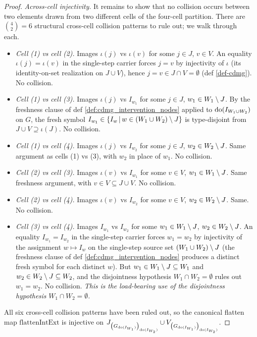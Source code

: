 \documentclass[main]{subfiles}
\providecommand{\flattenIntExt}{\mathrm{flattenIntExt}}
\begin{document}
\begin{proof}
\emph{Across-cell injectivity.}
It remains to show that no collision occurs between two elements drawn from two different cells of the four-cell partition. There are $\binom{4}{2} = 6$ structural cross-cell collision patterns to rule out; we walk through each.
\begin{itemize}
    \item \emph{Cell (1) vs cell (2).} Images $\iota(j)$ vs $\iota(v)$ for some $j \in J$, $v \in V$. An equality $\iota(j) = \iota(v)$ in the single-step carrier forces $j = v$ by injectivity of $\iota$ (its identity-on-set realization on $J \cup V$), hence $j = v \in J \cap V = \emptyset$ (def \ref{def-cdmg}). No collision.
    \item \emph{Cell (1) vs cell (3).} Images $\iota(j)$ vs $I_{w_1}$ for some $j \in J$, $w_1 \in W_1 \setminus J$. By the freshness clause of def \ref{def:cdmg_intervention_nodes} applied to $\operatorname{do}(I_{W_1 \cup W_2})$ on $G$, the fresh symbol $I_{w_1} \in \left \{ I_w \,\middle|\, w \in (W_1 \cup W_2) \setminus J \right \}$ is type-disjoint from $J \cup V \supseteq \iota(J)$. No collision.
    \item \emph{Cell (1) vs cell (4).} Images $\iota(j)$ vs $I_{w_2}$ for some $j \in J$, $w_2 \in W_2 \setminus J$. Same argument as cells (1) vs (3), with $w_2$ in place of $w_1$. No collision.
    \item \emph{Cell (2) vs cell (3).} Images $\iota(v)$ vs $I_{w_1}$ for some $v \in V$, $w_1 \in W_1 \setminus J$. Same freshness argument, with $v \in V \subseteq J \cup V$. No collision.
    \item \emph{Cell (2) vs cell (4).} Images $\iota(v)$ vs $I_{w_2}$ for some $v \in V$, $w_2 \in W_2 \setminus J$. Same. No collision.
    \item \emph{Cell (3) vs cell (4).} Images $I_{w_1}$ vs $I_{w_2}$ for some $w_1 \in W_1 \setminus J$, $w_2 \in W_2 \setminus J$. An equality $I_{w_1} = I_{w_2}$ in the single-step carrier forces $w_1 = w_2$ by injectivity of the assignment $w \mapsto I_w$ on the single-step source set $(W_1 \cup W_2) \setminus J$ (the freshness clause of def \ref{def:cdmg_intervention_nodes} produces a distinct fresh symbol for each distinct $w$). But $w_1 \in W_1 \setminus J \subseteq W_1$ and $w_2 \in W_2 \setminus J \subseteq W_2$, and the disjointness hypothesis $W_1 \cap W_2 = \emptyset$ rules out $w_1 = w_2$. No collision. \emph{This is the load-bearing use of the disjointness hypothesis $W_1 \cap W_2 = \emptyset$.}
\end{itemize}
All six cross-cell collision patterns have been ruled out, so the canonical flatten map $\flattenIntExt$ is injective on $J_{\left ( G_{\operatorname{do}(I_{W_1})} \right )_{\operatorname{do}(I_{W_2})}} \cup V_{\left ( G_{\operatorname{do}(I_{W_1})} \right )_{\operatorname{do}(I_{W_2})}}$. \checkmark


\end{proof}
\end{document}
